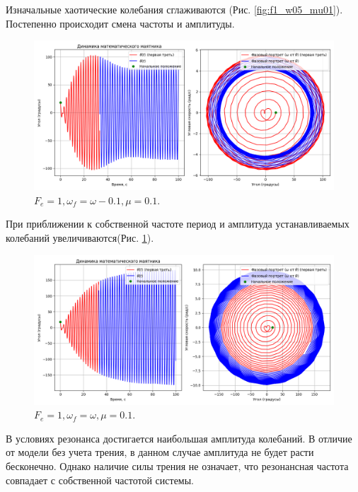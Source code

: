 Изначальные хаотические колебания сглаживаются (Рис. \ref{fig:f1_w05_mu01}). Постепенно происходит смена частоты и амплитуды. 

\begin{figure}[h]  %
	\centering
	\includegraphics[width=1\textwidth]{imgs/f1ww-01mu01.png}  %
	\caption{$F_e = 1, \omega_f = \omega - 0.1, \mu = 0.1$.}  %
	\label{fig:f1_w_mu01}  %
\end{figure}

При приближении к собственной частоте период и амплитуда устанавливаемых колебаний увеличиваются(Рис. \ref{fig:f1_w_mu01}).

\begin{figure}[h]  %
	\centering
	\includegraphics[width=1\textwidth]{imgs/tired.png}  %
	\caption{$F_e = 1, \omega_f = \omega , \mu = 0.1$.}  %
	\label{fig:f1}  %
\end{figure}

В условиях резонанса достигается наибольшая амплитуда колебаний. В отличие от модели без учета трения, в данном случае амплитуда не будет расти бесконечно. Однако наличие силы трения не означает, что резонансная частота совпадает с собственной частотой системы.
\newpage

